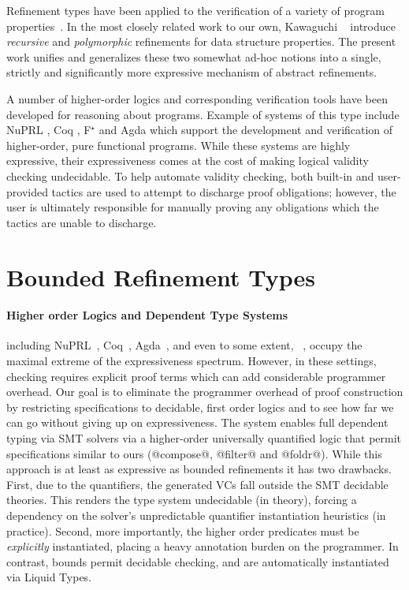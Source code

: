 Refinement types have been applied to the verification of a variety of
program properties~\cite{pfenningxi98,Dunfield,GordonTOPLAS2011,FournetCCS11}.
%
In the most closely related work to our own, Kawaguchi \etal~\cite{LiquidPLDI09} 
introduce \emph{recursive} and \emph{polymorphic} refinements for data
structure properties.
%
The present work unifies and generalizes these two somewhat ad-hoc notions 
into a single, strictly and significantly more expressive mechanism of
abstract refinements.

A number of higher-order logics and corresponding verification tools
have been developed for reasoning about programs.
%
Example of systems of this type include NuPRL \cite{Constable86},
Coq \cite{coq-book}, F$^\star$ \cite{SwamyCFSBY11} and Agda \cite{norell07}
which support the development and verification of higher-order, 
pure functional programs.
%
While these systems are highly expressive, their expressiveness comes at the
cost of making logical validity checking undecidable.
%
To help automate validity checking, both built-in and user-provided
tactics are used to attempt to discharge proof obligations; however,
the user is ultimately responsible for manually proving any
obligations which the tactics are unable to discharge.

\section{Bounded Refinement Types}\label{sec:abstractrefinements:related}

\paragraph{Higher order Logics and Dependent Type Systems}
%
including
NuPRL~\citep{Constable86},
Coq~\citep{coq-book}, Agda~\citep{norell07},
and even to some extent, \haskell~\citep{JonesVWW06, McBride02},
occupy the maximal extreme of the expressiveness spectrum.
However, in these settings, checking requires explicit
proof terms which can add considerable programmer overhead.
%
Our goal is to eliminate the programmer overhead of
proof construction by restricting specifications to
decidable, first order logics and to see how far
we can go without giving up on expressiveness.
%
The \fstar system enables full dependent typing via
SMT solvers via a higher-order universally quantified
logic that permit specifications similar to ours
(\eg @compose@, @filter@ and @foldr@).
%
While this approach is at least as expressive
as bounded refinements it has two drawbacks.
%
First, due to the quantifiers, the generated VCs
fall outside the SMT decidable theories.
This renders the type system undecidable (in theory),
forcing a dependency on the solver's unpredictable
quantifier instantiation heuristics (in practice).
%
Second, more importantly, %
the higher order
predicates must be \emph{explicitly} instantiated,
placing a heavy annotation burden on the programmer.
%
In contrast, bounds permit decidable
checking, and are automatically instantiated
via Liquid Types.


